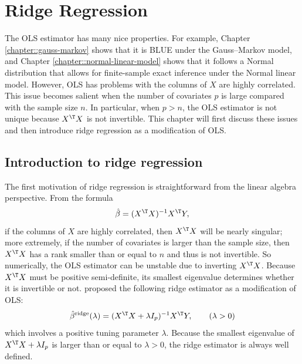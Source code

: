  
\chapter{Ridge Regression}
\label{chapter::ridge-regression} 
 
 
 
The OLS estimator has many nice properties. For example, Chapter \ref{chapter::gauss-markov} shows that it is BLUE under the Gauss--Markov model, and Chapter \ref{chapter::normal-linear-model} shows that it follows a Normal distribution that allows for finite-sample exact inference under the Normal linear model.
However, OLS has problems with the columns of $X$ are highly correlated. This issue becomes salient when the number of covariates $p$ is large compared with the sample size $n$. In particular, when $p>n$, the OLS estimator is not unique because $X^{\T}X$ is not invertible. This chapter will first discuss these issues and then introduce ridge regression as a modification of OLS. 



 

\section{Introduction to ridge regression}


The first motivation of ridge regression is straightforward from the linear algebra perspective.  From the formula
\[
\hat{\beta}=(X^{\T}X)^{-1}X^{\T}Y,
\]
if the columns of $X$ are highly correlated, then $X^{\T}X$ will
be nearly singular; more extremely, if the number of covariates is larger than the sample size, then $X^{\T}X$ has a rank smaller than
or equal to $n$ and thus is not invertible. So numerically, the OLS
estimator can be unstable due to inverting $X^{\T}X$. Because $X^{\T}X$
must be positive semi-definite, its smallest eigenvalue determines
whether it is invertible or not. \citet{hoerl1970ridge} proposed
the following ridge estimator as a modification of OLS:
\begin{equation}
\hat{\beta}^{\text{ridge}}(\lambda)=(X^{\T}X+\lambda I_{p})^{-1}X^{\T}Y, \qquad(\lambda>0)
\label{eq::ridge-hoerl1970form}
\end{equation}
which involves a positive tuning parameter $\lambda$. 
Because the smallest eigenvalue of $X^{\T}X+\lambda I_{p}$ is larger
than or equal to $\lambda>0$, the ridge estimator is always well
defined. 


